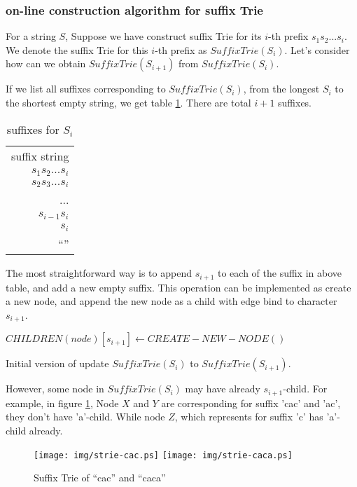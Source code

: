\documentclass{article}
\begin{document}
\subsubsection{on-line construction algorithm for suffix Trie}
For a string $S$, Suppose we have construct suffix Trie for its $i$-th prefix
$s_1s_2...s_i$. We denote the suffix Trie for this $i$-th prefix as $SuffixTrie(S_i)$.
Let's consider how can we obtain $SuffixTrie(S_{i+1})$ from $SuffixTrie(S_i)$.

If we list all suffixes corresponding to $SuffixTrie(S_i)$, from the longest 
$S_i$ to the shortest empty string, we get table \ref{tab:suffixes_s_i}. There
are total $i+1$ suffixes.

\begin{table}
  \begin{tabular}{r}
    suffix string \\
    $s_1s_2...s_i$ \\
    $s_2s_3...s_i$ \\
    ... \\
    $s_{i-1}s_i$ \\
    $s_i$ \\
    ``'' \\
  \end{tabular}
  \caption{suffixes for $S_i$}
  \label{tab:suffixes_s_i}
\end{table}

The most straightforward way is to append $s_{i+1}$ to each of the suffix in above
table, and add a new empty suffix. This operation can be implemented as create
a new node, and append the new node as a child with edge bind to character $s_{i+1}$.

\begin{algorithm}
\begin{algorithmic}
  \STATE $CHILDREN(node)[s_{i+1}] \leftarrow CREATE-NEW-NODE()$
\ENDFOR
\end{algorithmic}
\caption{Initial version of update $SuffixTrie(S_i)$ to $SuffixTrie(S_{i+1})$.}
\label{algo:strie1}
\end{algorithm}

However, some node in $SuffixTrie(S_i)$ may have already $s_{i+1}$-child. 
For example, in figure \ref{fig:strie-cac}, Node $X$ and $Y$ are corresponding 
for suffix 'cac' and 'ac', they don't have 'a'-child.
While node $Z$, which represents for suffix 'c' has 'a'-child already.

\begin{figure}[htbp]
   \begin{center}
     \texttt{[image: img/strie-cac.ps]}
     \texttt{[image: img/strie-caca.ps]}
     \caption{Suffix Trie of ``cac'' and ``caca''}
     \label{fig:strie-cac}
   \end{center}
\end{figure}
\end{document}

